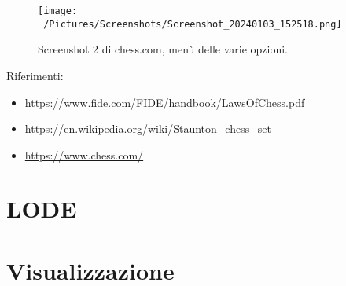 \documentclass[12pt]{book}
\begin{document}
\begin{figure}[h]
  \caption{Screenshot 2 di chess.com, menù delle varie opzioni.}
  \centering
  \label{fig:chess.com_2}
  \texttt{[image: ~/Pictures/Screenshots/Screenshot\_20240103\_152518.png]}
\end{figure}

Riferimenti:
\begin{itemize}

  \item \url{https://www.fide.com/FIDE/handbook/LawsOfChess.pdf}
  \item \url{https://en.wikipedia.org/wiki/Staunton_chess_set}
  \item \url{https://www.chess.com/}

\end{itemize}

\chapter{LODE}

\chapter{Visualizzazione}
\end{document}
